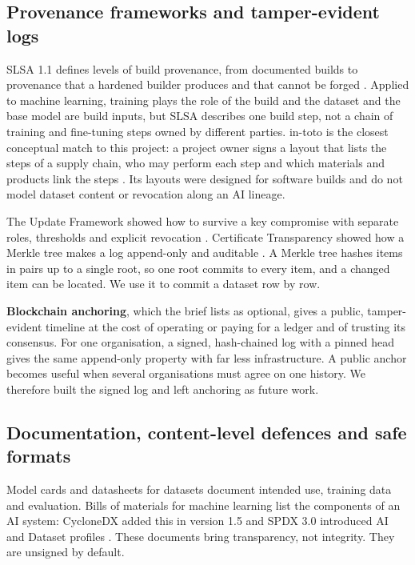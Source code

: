 \subsection{Provenance frameworks and tamper-evident logs}
SLSA 1.1 defines levels of build provenance, from documented builds to provenance that a hardened builder
produces and that cannot be forged \cite{slsa11}. Applied to machine learning, training plays the role of the
build and the dataset and the base model are build inputs, but SLSA describes one build step, not a chain of
training and fine-tuning steps owned by different parties. in-toto is the closest conceptual match to this
project: a project owner signs a layout that lists the steps of a supply chain, who may perform each step and
which materials and products link the steps \cite{intoto2019}. Its layouts were designed for software builds and
do not model dataset content or revocation along an AI lineage.

The Update Framework showed how to survive a key compromise with separate roles, thresholds and explicit
revocation \cite{tuf2010}. Certificate Transparency showed how a Merkle tree makes a log append-only and
auditable \cite{rfc6962}. A Merkle tree hashes items in pairs up to a single root, so one root commits to every
item, and a changed item can be located. We use it to commit a dataset row by row.

\textbf{Blockchain anchoring}, which the brief lists as optional, gives a public, tamper-evident timeline at
the cost of operating or paying for a ledger and of trusting its consensus. For one organisation, a signed,
hash-chained log with a pinned head gives the same append-only property with far less infrastructure. A public
anchor becomes useful when several organisations must agree on one history. We therefore built the signed log
and left anchoring as future work.

\subsection{Documentation, content-level defences and safe formats}
Model cards \cite{modelcards} and datasheets for datasets \cite{datasheets} document intended use, training data
and evaluation. Bills of materials for machine learning list the components of an AI system: CycloneDX added
this in version 1.5 \cite{cyclonedx15} and SPDX 3.0 introduced AI and Dataset profiles \cite{spdx3}. These
documents bring transparency, not integrity. They are unsigned by default.

